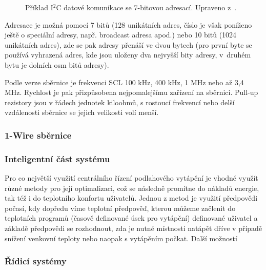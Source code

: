 \begin{figure}[H]
    \centering
    \def\svgwidth{\columnwidth}
    
    \caption{Příklad I$^2$C datové komunikace se 7-bitovou adresací. Upraveno z~\cite{i2c-sbernice-datovy-paket-7bit-adresa}.}
    \label{fig:i2c-sbernice-datova-komunikace-7bit-adresa}
\end{figure}

Adresace je možná pomocí 7 bitů (128 unikátních adres, číslo je však poníženo ještě o speciální adresy, např. broadcast adresa apod.) nebo 10 bitů (1024 unikátních adres), zde se pak adresy přenáší ve dvou bytech (pro první byte se používá vyhrazená adres, kde jsou uloženy dva nejvyšší bity adresy, v~druhém bytu je dolních osm bitů adresy).

Podle verze sběrnice je frekvenci SCL 100 kHz, 400 kHz, 1 MHz nebo až 3,4 MHz. Rychlost je pak přizpůsobena nejpomalejšímu zařízení na sběrnici. Pull-up rezistory jsou v řádech jednotek kiloohmů, s rostoucí frekvencí nebo delší vzdálenosti sběrnice se jejich velikosti volí menší.




\subsubsection{1-Wire sběrnice}

\subsubsection{Inteligentní část systému}
Pro co největší využití centrálního řízení podlahového vytápění je vhodné využít různé metody pro její optimalizaci, což se následně promítne do nákladů energie, tak též i do teplotního konfortu uživatelů. Jednou z metod je využití předpovědi počasí, kdy dopředu víme teplotní předpověď, kterou můžeme začlenit do teplotních programů (časově definované úsek pro vytápění) definované uživatel a základě  předpovědi se rozhodnout, zda je nutné místnosti natápět dříve v případě snížení venkovní teploty nebo naopak s vytápěním počkat. Další možností 

\subsubsection{Řídicí systémy}
